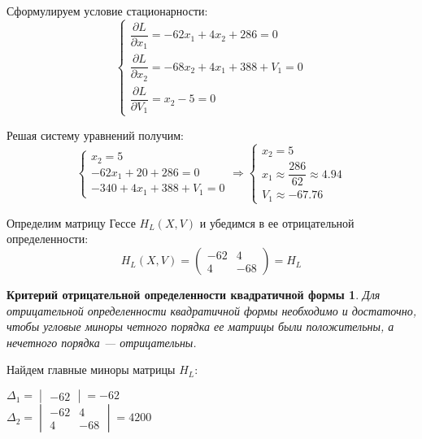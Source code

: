 Сформулируем условие стационарности:
\begin{equation*}
\begin{cases}
\dfrac{\partial L}{\partial x_1} = -62 x_1 + 4 x_2 + 286 = 0 \\
\dfrac{\partial L}{\partial x_2} = -68 x_2 + 4 x_1 + 388 + V_1 = 0 \\
\dfrac{\partial L}{\partial V_1} = x_2 - 5 = 0
\end{cases}
\end{equation*}

Решая систему уравнений получим:
\begin{equation*}
\begin{cases}
x_2 = 5 \\
-62 x_1 + 20 + 286 = 0 \\
-340 + 4 x_1 + 388 + V_1 = 0
\end{cases}
\Rightarrow
\begin{cases}
x_2 = 5 \\
x_1 \approx \dfrac{286}{62} \approx 4.94 \\
V_1 \approx -67.76
\end{cases}
\end{equation*}

Определим матрицу Гессе $H_L(X, V)$ и убедимся в ее отрицательной определенности:
\begin{equation*}
H_L(X, V) =
\begin{pmatrix}
	-62 & 4 \\
	4 & -68
\end{pmatrix} = H_L 
\end{equation*}

\newtheorem*{theorem1}{Критерий отрицательной определенности квадратичной формы}
\begin{theorem1}
Для отрицательной определенности квадратичной формы необходимо и достаточно, чтобы угловые миноры четного порядка ее матрицы были положительны, а нечетного порядка — отрицательны.
\end{theorem1}

Найдем главные миноры матрицы $H_L$:
\begin{multicols}{2}
\centering
$\Delta_1 = \begin{vmatrix} -62 \end{vmatrix} = -62$\\
$\Delta_2 = \begin{vmatrix}
	-62 & 4 \\
	4 & -68
\end{vmatrix} = 4200$
\end{multicols}

